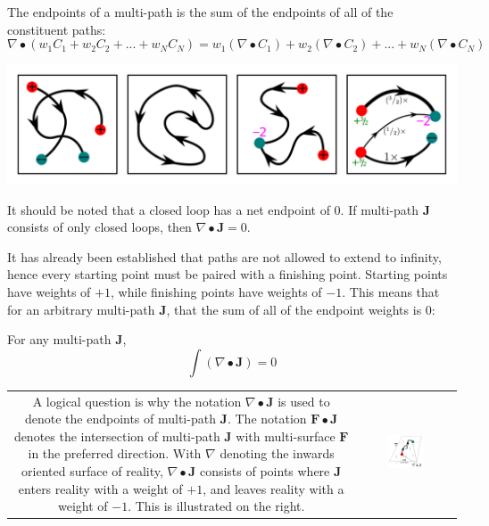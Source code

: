 The endpoints of a multi-path is the sum of the endpoints of all of the constituent paths:
\[\nabla \bullet (w_1 C_1 + w_2 C_2 + ... + w_N C_N)
= w_1(\nabla \bullet C_1) + w_2(\nabla \bullet C_2) + ... + w_N(\nabla \bullet C_N)\]

\begin{center}
\includegraphics[width = \textwidth]{Boundaries/Path_endpoints/path_endpoint_examples_2}
\end{center}


\begin{thm}
It should be noted that a closed loop has a net endpoint of \(0\). If multi-path \(\mathbf{J}\) consists of only closed loops, then \(\nabla \bullet \mathbf{J} = 0\). 
\end{thm}

It has already been established that paths are not allowed to extend to infinity, hence every starting point must be paired with a finishing point. Starting points have weights of \(+1\), while finishing points have weights of \(-1\). This means that for an arbitrary multi-path \(\mathbf{J}\), that the sum of all of the endpoint weights is \(0\): 
\begin{thm}
For any multi-path \(\mathbf{J}\),
\[\int (\nabla \bullet \mathbf{J}) = 0\] 
\end{thm}

\begin{tabular}{cc}
\parbox{0.5\textwidth}{
A logical question is why the notation \(\nabla \bullet \mathbf{J}\) is used to denote the endpoints of multi-path \(\mathbf{J}\). The notation \(\mathbf{F} \bullet \mathbf{J}\) denotes the intersection of multi-path \(\mathbf{J}\) with multi-surface \(\mathbf{F}\) in the preferred direction. With \(\nabla\) denoting the inwards oriented surface of reality, \(\nabla \bullet \mathbf{J}\) consists of points where \(\mathbf{J}\) enters reality with a weight of \(+1\), and leaves reality with a weight of \(-1\). This is illustrated on the right.
} & \parbox{0.4\textwidth}{
\includegraphics[width = 0.4\textwidth]{Boundaries/Path_endpoints/path_surface_intersections_and_path_endpoints}
}
\end{tabular}





